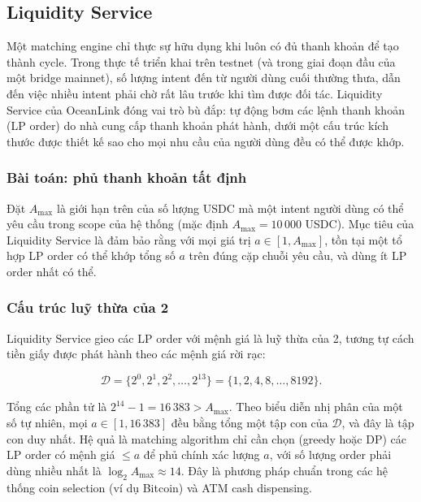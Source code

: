 
\subsection{Liquidity Service}
\label{sec:liquidity-service}

Một matching engine chỉ thực sự hữu dụng khi luôn có đủ thanh khoản để tạo thành cycle. Trong thực tế triển khai trên testnet (và trong giai đoạn đầu của một bridge mainnet), số lượng intent đến từ người dùng cuối thường thưa, dẫn đến việc nhiều intent phải chờ rất lâu trước khi tìm được đối tác. Liquidity Service của OceanLink đóng vai trò bù đắp: tự động bơm các lệnh thanh khoản (LP order) do nhà cung cấp thanh khoản phát hành, dưới một cấu trúc kích thước được thiết kế sao cho mọi nhu cầu của người dùng đều có thể được khớp.

\subsubsection{Bài toán: phủ thanh khoản tất định}

Đặt $A_{\max}$ là giới hạn trên của số lượng USDC mà một intent người dùng có thể yêu cầu trong scope của hệ thống (mặc định $A_{\max} = 10\,000$ USDC). Mục tiêu của Liquidity Service là đảm bảo rằng với mọi giá trị $a \in [1, A_{\max}]$, tồn tại một tổ hợp LP order có thể khớp tổng số $a$ trên đúng cặp chuỗi yêu cầu, và dùng ít LP order nhất có thể.

\subsubsection{Cấu trúc luỹ thừa của 2}

Liquidity Service gieo các LP order với mệnh giá là luỹ thừa của 2, tương tự cách tiền giấy được phát hành theo các mệnh giá rời rạc:

\[
  \mathcal{D} = \{ 2^0, 2^1, 2^2, \dots, 2^{13} \}
              = \{ 1, 2, 4, 8, \dots, 8192 \}.
\]

Tổng các phần tử là $2^{14} - 1 = 16\,383 > A_{\max}$. Theo biểu diễn nhị phân của một số tự nhiên, mọi $a \in [1, 16\,383]$ đều bằng tổng một tập con của $\mathcal{D}$, và đây là tập con duy nhất. Hệ quả là matching algorithm chỉ cần chọn (greedy hoặc DP) các LP order có mệnh giá $\le a$ để phủ chính xác lượng $a$, với số lượng order phải dùng nhiều nhất là $\log_2 A_{\max} \approx 14$. Đây là phương pháp chuẩn trong các hệ thống coin selection (ví dụ Bitcoin) và ATM cash dispensing.

